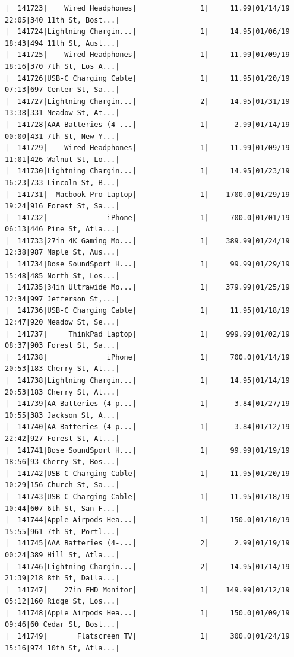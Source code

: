 \documentclass[
  letterpaper,
  DIV=11,
  numbers=noendperiod]{scrartcl}
\begin{document}
\begin{verbatim}
|  141723|    Wired Headphones|               1|     11.99|01/14/19 22:05|340 11th St, Bost...|
|  141724|Lightning Chargin...|               1|     14.95|01/06/19 18:43|494 11th St, Aust...|
|  141725|    Wired Headphones|               1|     11.99|01/09/19 18:16|370 7th St, Los A...|
|  141726|USB-C Charging Cable|               1|     11.95|01/20/19 07:13|697 Center St, Sa...|
|  141727|Lightning Chargin...|               2|     14.95|01/31/19 13:38|331 Meadow St, At...|
|  141728|AAA Batteries (4-...|               1|      2.99|01/14/19 00:00|431 7th St, New Y...|
|  141729|    Wired Headphones|               1|     11.99|01/09/19 11:01|426 Walnut St, Lo...|
|  141730|Lightning Chargin...|               1|     14.95|01/23/19 16:23|733 Lincoln St, B...|
|  141731|  Macbook Pro Laptop|               1|    1700.0|01/29/19 19:24|916 Forest St, Sa...|
|  141732|              iPhone|               1|     700.0|01/01/19 06:13|446 Pine St, Atla...|
|  141733|27in 4K Gaming Mo...|               1|    389.99|01/24/19 12:38|987 Maple St, Aus...|
|  141734|Bose SoundSport H...|               1|     99.99|01/29/19 15:48|485 North St, Los...|
|  141735|34in Ultrawide Mo...|               1|    379.99|01/25/19 12:34|997 Jefferson St,...|
|  141736|USB-C Charging Cable|               1|     11.95|01/18/19 12:47|920 Meadow St, Se...|
|  141737|     ThinkPad Laptop|               1|    999.99|01/02/19 08:37|903 Forest St, Sa...|
|  141738|              iPhone|               1|     700.0|01/14/19 20:53|183 Cherry St, At...|
|  141738|Lightning Chargin...|               1|     14.95|01/14/19 20:53|183 Cherry St, At...|
|  141739|AA Batteries (4-p...|               1|      3.84|01/27/19 10:55|383 Jackson St, A...|
|  141740|AA Batteries (4-p...|               1|      3.84|01/12/19 22:42|927 Forest St, At...|
|  141741|Bose SoundSport H...|               1|     99.99|01/19/19 18:56|93 Cherry St, Bos...|
|  141742|USB-C Charging Cable|               1|     11.95|01/20/19 10:29|156 Church St, Sa...|
|  141743|USB-C Charging Cable|               1|     11.95|01/18/19 10:44|607 6th St, San F...|
|  141744|Apple Airpods Hea...|               1|     150.0|01/10/19 15:55|961 7th St, Portl...|
|  141745|AAA Batteries (4-...|               2|      2.99|01/19/19 00:24|389 Hill St, Atla...|
|  141746|Lightning Chargin...|               2|     14.95|01/14/19 21:39|218 8th St, Dalla...|
|  141747|    27in FHD Monitor|               1|    149.99|01/12/19 05:12|160 Ridge St, Los...|
|  141748|Apple Airpods Hea...|               1|     150.0|01/09/19 09:46|60 Cedar St, Bost...|
|  141749|       Flatscreen TV|               1|     300.0|01/24/19 15:16|974 10th St, Atla...|

\end{verbatim}
\end{document}
